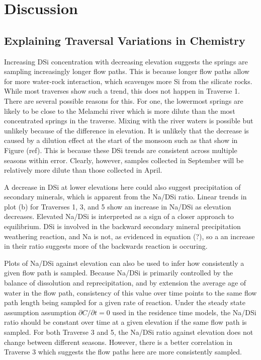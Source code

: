 

\section{Discussion}

\subsection{Explaining Traversal Variations in Chemistry}

Increasing DSi concentration with decreasing elevation suggests the springs are sampling increasingly longer flow paths. This is because longer flow paths allow for more water-rock interaction, which scavenges more Si from the silicate rocks. While most traverses show such a trend, this does not happen in Traverse 1. There are several possible reasons for this. For one, the lowermost springs are likely to be close to the Melamchi river which is more dilute than the most concentrated springs in the traverse. Mixing with the river waters is possible but unlikely because of the difference in elevation. It is unlikely that the decrease is caused by a dilution effect at the start of the monsoon such as that show in Figure (ref). This is because these DSi trends are consistent across multiple seasons within error. Clearly, however, samples collected in September will be relatively more dilute than those collected in April.

\bsk

A decrease in DSi at lower elevations here could also suggest precipitation of secondary minerals, which is apparent from the Na/DSi ratio. Linear trends in plot (b) for Traverses 1, 3, and 5 show an increase in Na/DSi as elevation decreases. Elevated Na/DSi is interpreted as a sign of a closer approach to equilibrium. DSi is involved in the backward secondary mineral precipitation weathering reaction, and Na is not, as evidenced in equation (?), so a an increase in their ratio suggests more of the backwards reaction is occuring.

\bsk

Plots of Na/DSi against elevation can also be used to infer how consistently a given flow path is sampled. Because Na/DSi is primarily controlled by the balance of dissolution and reprecipitation, and by extension the average age of water in the flow path, consistency of this value over time points to the same flow path length being sampled for a given rate of reaction. Under the steady state assumption assumption $\partial C/\partial t = 0$ used in the residence time models, the Na/DSi ratio should be constant over time at a given elevation if the same flow path is sampled. For both Traverse 3 and 5, the Na/DSi ratio against elevation does not change between different seasons. However, there is a better correlation in Traverse 3 which suggests the flow paths here are more consistently sampled.



